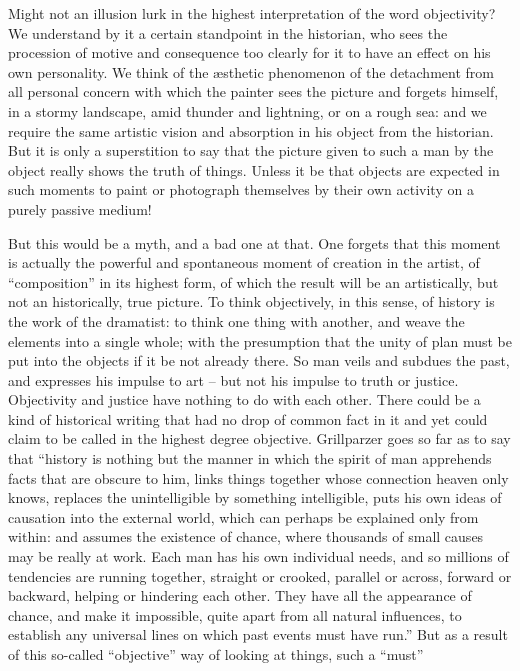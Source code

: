 Might not an illusion lurk in the highest interpretation of the word
objectivity? We understand by it a certain standpoint in the
historian, who sees the procession of motive and consequence too
clearly for it to have an effect on his own personality. We think of
the æsthetic phenomenon of the detachment from all personal concern
with which the painter sees the picture and forgets himself, in a
stormy landscape, amid thunder and lightning, or on a rough sea: and
we require the same artistic vision and absorption in his object from
the historian. But it is only a superstition to say that the picture
given to such a man by the object really shows the truth of things.
Unless it be that objects are expected in such moments to paint or
photograph themselves by their own activity on a purely passive
medium!

But this would be a myth, and a bad one at that. One forgets that
this moment is actually the powerful and spontaneous moment of
creation in the artist, of \enquote{composition} in its highest form, of
which the result will be an artistically, but not an historically,
true picture. To think objectively, in this sense, of history is the
work of the dramatist: to think one thing with another, and weave the
elements into a single whole; with the presumption that the unity of
plan must be put into the objects if it be not already there. So man
veils and subdues the past, and expresses his impulse to art -- but not
his impulse to truth or justice. Objectivity and justice have nothing
to do with each other. There could be a kind of historical writing
that had no drop of common fact in it and yet could claim to be
called in the highest degree objective. Grillparzer goes so far as to
say that \enquote{history is nothing but the manner in which the spirit of
man apprehends facts that are obscure to him, links things together
whose connection heaven only knows, replaces the unintelligible by
something intelligible, puts his own ideas of causation into the
external world, which can perhaps be explained only from within: and
assumes the existence of chance, where thousands of small causes may
be really at work. Each man has his own individual needs, and so
millions of tendencies are running together, straight or crooked,
parallel or across, forward or backward, helping or hindering each
other. They have all the appearance of chance, and make it
impossible, quite apart from all natural influences, to establish any
universal lines on which past events must have run.} But as a result
of this so-called \enquote{objective} way of looking at things, such a \enquote{must}
